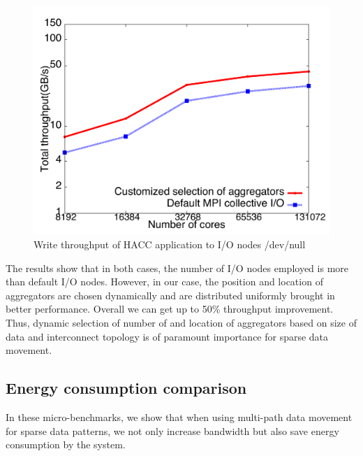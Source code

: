 \documentclass[final,5p,times]{elsarticle}
\begin{document}
\begin{figure}[!htb]
\vspace{-0.1in}
\centering
\includegraphics[scale=0.3]{figures/hacc_agg.pdf}
\vspace{-0.1in}
\caption{Write throughput of HACC application to I/O nodes /dev/null}
\vspace{-0.1in}
\label{fig:hacc_agg}
\end{figure}

The results show that in both cases, the number of I/O nodes employed is more than default I/O nodes. However, in our case, the position and location of aggregators are chosen dynamically and are distributed uniformly brought in better performance. Overall we can get up to 50\% throughput improvement. Thus, dynamic selection of number of and location of aggregators based on size of data and interconnect topology is of paramount importance for sparse data movement.

\subsection{Energy consumption comparison}
In these micro-benchmarks, we show that when using multi-path data movement for sparse data patterns, we not only increase bandwidth but also save energy consumption by the system.
\end{document}
